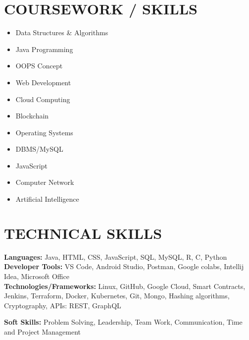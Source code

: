 \documentclass[letterpaper,11pt]{article}
\newcommand{\resumeSubHeadingListStart}{\begin{itemize}[leftmargin=0.0in, label={}]}
\newcommand{\resumeSubHeadingListEnd}{\end{itemize}}
\begin{document}
\section{COURSEWORK / SKILLS}
        \begin{multicols}{4}
            \begin{itemize}[itemsep=-2pt, parsep=5pt]
                \item Data Structures \& Algorithms
                \item Java Programming
                \item OOPS Concept
                \item Web Development
                \item Cloud Computing
                \item Blockchain
                \item Operating Systems
                \item DBMS/MySQL
                \item JavaScript
                \item Computer Network
                \item Artificial Intelligence
                
            \end{itemize}
        \end{multicols}
        \vspace*{2.0\multicolsep}


\section{TECHNICAL SKILLS}
 \begin{itemize}[leftmargin=0.15in, label={}]
    \small{\item{
     \textbf{\normalsize{Languages:}}{ \normalsize{Java, HTML, CSS, JavaScript, SQL, MySQL, R, C, Python}} \vspace{4pt}\\
     
     \textbf{\normalsize{Developer Tools:}}{ \normalsize{VS Code, Android Studio, Postman, Google colabs, Intellij Idea, Microsoft Office }} \vspace{4pt}\\
     
     \textbf{\normalsize{Technologies/Frameworks:}}{\normalsize{ Linux, GitHub, Google Cloud, Smart Contracts, Jenkins, Terraform, Docker, Kubernetes, Git, Mongo, Hashing algorithms, Cryptography, APIs: REST, GraphQL}} \\
     \vspace{5pt}
     
     \textbf{\normalsize{Soft Skills:}}{ \normalsize{Problem Solving, Leadership, Team Work, Communication, Time and Project Management }} \vspace{4pt}\\

     
    }}
 \end{itemize}
 \vspace{-15pt}
\end{document}
